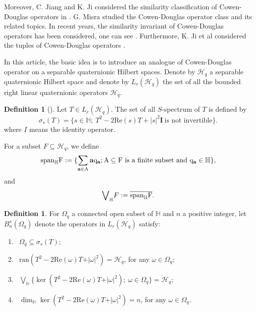 \documentclass[pdflatex,sn-mathphys-num]{sn-jnl}%
\theoremstyle{thmstyleone}%
\theoremstyle{thmstyletwo}%
\theoremstyle{thmstylethree}%
\newtheorem{definition}{Definition}%
\theoremstyle{definition}
\newtheorem{definition}[theorem]{Definition}
\theoremstyle{remark}
\begin{document}
Moreover, C. Jiang and K. Ji considered
the similarity classification of Cowen-Douglas operators in \cite{JGJ, JJ}. G. Misra \cite{M} studied the Cowen-Douglas operator class and its related topics. In recent years,  the
similarity invariant of Cowen-Douglas operators has been considered, one can see \cite{JJK, JJW}.  Furthermore, K. Ji et al considered the tuples of Cowen-Douglas operators \cite{HJJX, JJKX}.


In this article, the basic idea is to introduce an analogue of Cowen-Douglas operator on a separable quaternionic Hilbert spaces.  Denote by $\mathcal{H}_q$ a separable quaternionic Hilbert space and denote by $L_r(\mathcal{H}_q)$ the set of all the bounded right linear quaternionic operators $\mathcal{H}_q$.

\begin{definition}[\cite{CSS}]\label{SSP}
	Let $T\in L_r(\mathcal{H}_q)$. The set of all $S$-spectrum of $T$ is defined by
	\[
	\sigma_s(T)=\{s\in\mathbb{H};\ T^2-2\mathrm{Re}(s)T+|s|^2\boldsymbol{I}~\text{is not invertible}\}.
	\]
    where $I$ means the identity operator.
\end{definition}

For a subset $F\subseteq \mathcal{H}_q$,  we define
\[
\rm{span}_{\mathbb{H}}F:=\{\sum\limits_{\mathbf{a}\in A} \mathbf{a}q_{\mathbf{a}}; A\subseteq F \ \text{is a finite subset and} \ q_{\mathbf{a}}\in \mathbb{H}\},
\]
and
\begin{equation*}
	{\bigvee}_{\mathbb{H}}F:=\overline{\rm{span}_{\mathbb{H}}F}.
\end{equation*}


\begin{definition}\label{SPCD}
	For $\Omega_q$ a connected open subset  of $\mathbb{H}$ and $n$ a positive integer, let $B_n^{s}(\Omega_q)$ denote the operators in $L_r(\mathcal{H}_q)$  satisfy:
\begin{enumerate}
	\item[(a)] \ $\Omega_q\subseteq\sigma_{s}(T)$; \\
	\item[(b)] \ $\mathrm{ran}(T^2-2\mathrm{Re}(\omega) T+\vert\omega \vert^2)=\mathcal{H}_q$, for any $\omega\in\Omega_q$;\\
	\item[(c)] \ $\bigvee_{\mathbb{H}} \{\ker(T^2-2\mathrm{Re}(\omega) T+\vert\omega \vert^2);\ \omega\in\Omega_q\}=\mathcal{H}_q$;\\
	\item[(d)] \ $\dim_{\mathbb{H}} \ker(T^2-2\mathrm{Re}(\omega)T+\vert\omega \vert^2)=n$, for any $\omega\in\Omega_q$.
\end{enumerate}
\end{definition}
\end{document}
